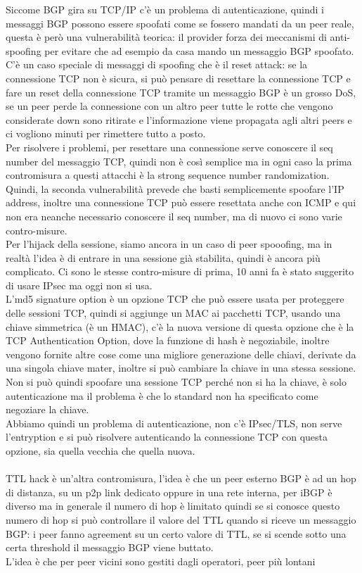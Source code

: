 \documentclass[12pt, oneside]{extbook} %
\begin{document}
Siccome BGP gira su TCP/IP c'è un problema di autenticazione, quindi i messaggi BGP possono essere spoofati come se fossero mandati da un peer reale, questa è però una vulnerabilità teorica: il provider forza dei meccanismi di anti-spoofing per evitare che ad esempio da casa mando un messaggio BGP spoofato.\\C'è un caso speciale di messaggi di spoofing che è il reset attack: se la connessione TCP non è sicura, si può pensare di resettare la connessione TCP e fare un reset della connessione TCP tramite un messaggio BGP è un grosso DoS, se un peer perde la connessione con un altro peer tutte le rotte che vengono considerate down sono ritirate e l'informazione viene propagata agli altri peers e ci vogliono minuti per rimettere tutto a posto.\\Per risolvere i problemi, per resettare una connessione serve conoscere il seq number del messaggio TCP, quindi non è così semplice ma in ogni caso la prima contromisura a questi attacchi è la strong sequence number randomization.\\Quindi, la seconda vulnerabilità prevede che basti semplicemente spoofare l'IP address, inoltre una connessione TCP può essere resettata anche con ICMP e qui non era neanche necessario conoscere il seq number, ma di nuovo ci sono varie contro-misure.\\Per l'hijack della sessione, siamo ancora in un caso di peer spooofing, ma in realtà l'idea è di entrare in una sessione già stabilita, quindi è ancora più complicato. Ci sono le stesse contro-misure di prima, 10 anni fa è stato suggerito di usare IPsec ma oggi non si usa.\\L'md5 signature option è un opzione TCP che può essere usata per proteggere delle sessioni TCP, quindi si aggiunge un MAC ai pacchetti TCP, usando una chiave simmetrica (è un HMAC), c'è la nuova versione di questa opzione che è la TCP Authentication Option, dove la funzione di hash è negoziabile, inoltre vengono fornite altre cose come una migliore generazione delle chiavi, derivate da una singola chiave mater, inoltre si può cambiare la chiave in una stessa sessione.\\Non si può quindi spoofare una sessione TCP perché non si ha la chiave, è solo autenticazione ma il problema è che lo standard non ha specificato come negoziare la chiave.\\Abbiamo quindi un problema di autenticazione, non c'è IPsec/TLS, non serve l'entryption e si può risolvere autenticando la connessione TCP con questa opzione, sia quella vecchia che quella nuova.\\\\TTL hack è un'altra contromisura, l'idea è che un peer esterno BGP è ad un hop di distanza, su un p2p link dedicato oppure in una rete interna, per iBGP è diverso ma in generale il numero di hop è limitato quindi se si conosce questo numero di hop si può controllare il valore del TTL quando si riceve un messaggio BGP: i peer fanno agreement su un certo valore di TTL, se si scende sotto una certa threshold il messaggio BGP viene buttato.\\L'idea è che per peer vicini sono gestiti dagli operatori, peer più lontani 
\end{document}
